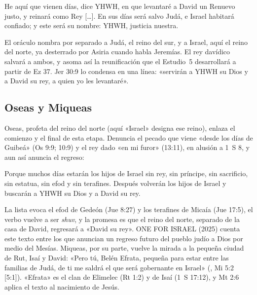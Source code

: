 \begin{cita}He aquí que vienen días, dice YHWH, en que levantaré a David un Renuevo justo, y reinará como Rey [\ldots]. En sus días será salvo Judá, e Israel habitará confiado; y este será su nombre: YHWH, justicia nuestra.\end{cita}

El oráculo nombra por separado a Judá, el reino del sur, y a Israel, aquí el reino del norte, ya desterrado por Asiria cuando habla Jeremías. El rey davídico salvará a ambos, y asoma así la reunificación que el Estudio~5 desarrollará a partir de Ez 37. Jer 30:9 lo condensa en una línea: «servirán a YHWH su Dios y a David su rey, a quien yo les levantaré».

\subsection{Oseas y Miqueas}
Oseas, profeta del reino del norte (aquí «Israel» designa ese reino), enlaza el comienzo y el final de esta etapa. Denuncia el pecado que viene «desde los días de Guibeá» (Os 9:9; 10:9) y el rey dado «en mi furor» (13:11), en alusión a 1~S 8, y aun así anuncia el regreso:

\begin{cita}Porque muchos días estarán los hijos de Israel sin rey, sin príncipe, sin sacrificio, sin estatua, sin efod y sin terafines. Después volverán los hijos de Israel y buscarán a YHWH su Dios y a David su rey.\end{cita}

La lista evoca el efod de Gedeón (Jue 8:27) y los terafines de Micaía (Jue 17:5), el verbo vuelve a ser \emph{shuv}, y la promesa es que el reino del norte, separado de la casa de David, regresará a «David su rey». ONE FOR ISRAEL (2025) cuenta este texto entre los que anuncian un regreso futuro del pueblo judío a Dios por medio del Mesías. Miqueas, por su parte, vuelve la mirada a la pequeña ciudad de Rut, Isaí y David: «Pero tú, Belén Efrata, pequeña para estar entre las familias de Judá, de ti me saldrá el que será gobernante en Israel» (, Mi 5:2 [5:1]). «Efrata» es el clan de Elimelec (Rt 1:2) y de Isaí (1~S 17:12), y Mt 2:6 aplica el texto al nacimiento de Jesús.


